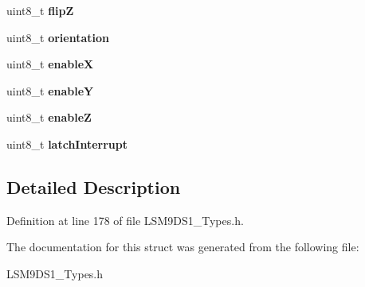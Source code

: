 \begin{DoxyCompactItemize}
uint8\+\_\+t {\bfseries flipZ}
\item 
\mbox{\label{structgyroSettings_a33239fd5c4a0fd74670455008c2701ee}} 
uint8\+\_\+t {\bfseries orientation}
\item 
\mbox{\label{structgyroSettings_a7c1000d1151579743faa376d49751f1d}} 
uint8\+\_\+t {\bfseries enableX}
\item 
\mbox{\label{structgyroSettings_a4d6ea95b7a52daab6d48dc128c83f3d8}} 
uint8\+\_\+t {\bfseries enableY}
\item 
\mbox{\label{structgyroSettings_a86a86182fd841bd651672d43803b5c63}} 
uint8\+\_\+t {\bfseries enableZ}
\item 
\mbox{\label{structgyroSettings_a3eb9f52cae013b107fbc5059220f9333}} 
uint8\+\_\+t {\bfseries latch\+Interrupt}
\end{DoxyCompactItemize}


\subsection{Detailed Description}


Definition at line 178 of file L\+S\+M9\+D\+S1\+\_\+\+Types.\+h.



The documentation for this struct was generated from the following file\+:\begin{DoxyCompactItemize}
\item 
L\+S\+M9\+D\+S1\+\_\+\+Types.\+h\end{DoxyCompactItemize}
